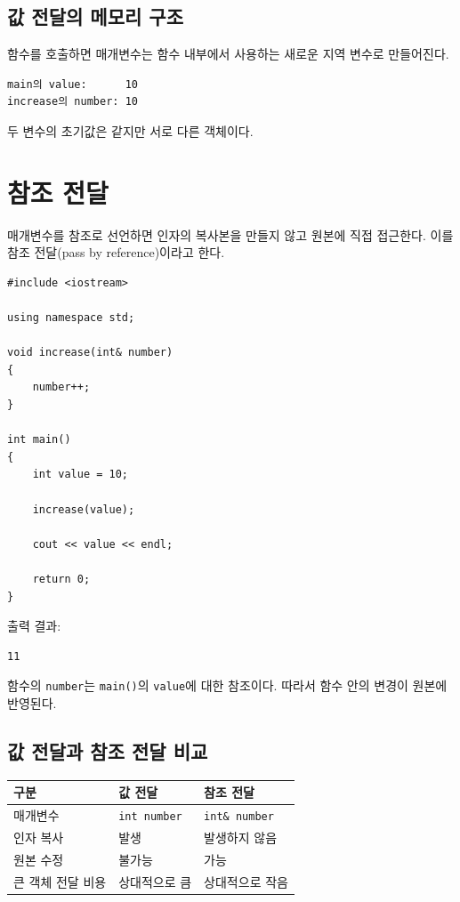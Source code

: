 \documentclass[11pt,a4paper]{article}
\begin{document}
\subsection{값 전달의 메모리 구조}

함수를 호출하면 매개변수는 함수 내부에서 사용하는 새로운 지역 변수로 만들어진다.

\begin{verbatim}
main의 value:      10
increase의 number: 10
\end{verbatim}

두 변수의 초기값은 같지만 서로 다른 객체이다.

\section{참조 전달}

매개변수를 참조로 선언하면 인자의 복사본을 만들지 않고 원본에 직접 접근한다.
이를 참조 전달(pass by reference)이라고 한다.

\begin{lstlisting}
#include <iostream>

using namespace std;

void increase(int& number)
{
    number++;
}

int main()
{
    int value = 10;

    increase(value);

    cout << value << endl;

    return 0;
}
\end{lstlisting}

출력 결과:

\begin{verbatim}
11
\end{verbatim}

함수의 \texttt{number}는 \texttt{main()}의 \texttt{value}에 대한 참조이다.
따라서 함수 안의 변경이 원본에 반영된다.

\subsection{값 전달과 참조 전달 비교}

\begin{center}
\begin{tabular}{lll}
\toprule
구분 & 값 전달 & 참조 전달 \\
\midrule
매개변수 & \texttt{int number} & \texttt{int\& number} \\
인자 복사 & 발생 & 발생하지 않음 \\
원본 수정 & 불가능 & 가능 \\
큰 객체 전달 비용 & 상대적으로 큼 & 상대적으로 작음 \\
\bottomrule
\end{tabular}
\end{center}
\end{document}

